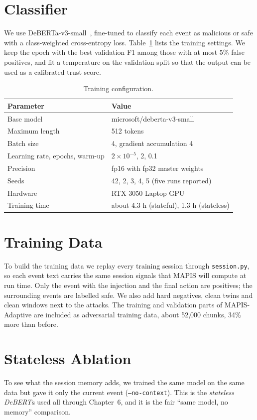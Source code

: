 \label{chap.5}
\section{Classifier}
We use DeBERTa-v3-small~\cite{he2021}, fine-tuned to classify each event as malicious or safe with a class-weighted cross-entropy loss. Table~\ref{tab:train} lists the training settings. We keep the epoch with the best validation F1 among those with at most 5\% false positives, and fit a temperature on the validation split so that the output can be used as a calibrated trust score.
\begin{table}[H]
\centering\small
\begin{tabular}{ll}
\toprule
Parameter & Value\\
\midrule
Base model & microsoft/deberta-v3-small\\
Maximum length & 512 tokens\\
Batch size & 4, gradient accumulation 4\\
Learning rate, epochs, warm-up & $2\times10^{-5}$, 2, 0.1\\
Precision & fp16 with fp32 master weights\\
Seeds & 42, 2, 3, 4, 5 (five runs reported)\\
Hardware & RTX 3050 Laptop GPU\\
Training time & about 4.3 h (stateful), 1.3 h (stateless)\\
\bottomrule
\end{tabular}
\caption{Training configuration.}
\label{tab:train}
\end{table}

\section{Training Data}
To build the training data we replay every training session through \texttt{session.py}, so each event text carries the same session signals that MAPIS will compute at run time. Only the event with the injection and the final action are positives; the surrounding events are labelled safe. We also add hard negatives, clean twins and clean windows next to the attacks. The training and validation parts of MAPIS-Adaptive are included as adversarial training data, about 52,000 chunks, 34\% more than before.

\section{Stateless Ablation}
To see what the session memory adds, we trained the same model on the same data but gave it only the current event (\texttt{--no-context}). This is the \emph{stateless DeBERTa} used all through Chapter~6, and it is the fair ``same model, no memory'' comparison.


